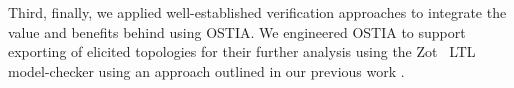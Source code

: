Third, finally, we applied well-established verification approaches to integrate
the value and benefits behind using OSTIA. We engineered OSTIA to support
exporting of elicited topologies for their further analysis using the
Zot~\cite{zot}
LTL model-checker using an
approach outlined in our previous work \cite{icsoft,BRS15}.

